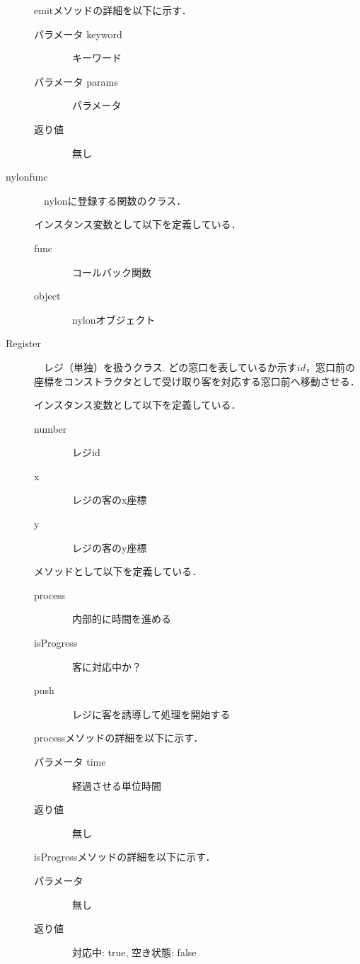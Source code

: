 \documentclass[12pt,a4j]{ltjsarticle}
\begin{document}
\begin{description}
emitメソッドの詳細を以下に示す．
\begin{description}
	\item[パラメータ keyword]　キーワード
	\item[パラメータ params]　パラメータ
	\item[返り値]　無し
\end{description}
\vspace{10mm}


\item[nylonfunc]　nylonに登録する関数のクラス．

インスタンス変数として以下を定義している．
\begin{description}
	\item[func]　コールバック関数
	\item[object]　nylonオブジェクト
\end{description}
\vspace{10mm}
\clearpage


\item[Register]　レジ（単独）を扱うクラス.
どの窓口を表しているか示す$id$，窓口前の座標をコンストラクタとして受け取り客を対応する窓口前へ移動させる．

インスタンス変数として以下を定義している．
\begin{description}
	\item[number]　レジid
	\item[x]　レジの客のx座標
	\item[y]　レジの客のy座標
\end{description}
\vspace{5mm}

メソッドとして以下を定義している．
\begin{description}
	\item[process]　内部的に時間を進める
	\item[isProgress]　客に対応中か？
	\item[push]　レジに客を誘導して処理を開始する
\end{description}
\vspace{5mm}

processメソッドの詳細を以下に示す．
\begin{description}
	\item[パラメータ time]　経過させる単位時間
	\item[返り値]　無し
\end{description}
\vspace{5mm}

isProgressメソッドの詳細を以下に示す．
\begin{description}
	\item[パラメータ]　無し
	\item[返り値]　対応中: true, 空き状態: false
\end{description}
\vspace{5mm}


\end{description}
\end{document}
